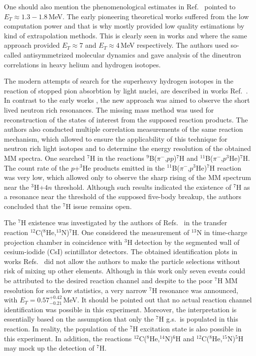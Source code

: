 One should also mention the phenomenological estimates in Ref.\ \cite{Golovkov:2004} pointed to $E_{T} \approx 1.3-1.8$\,MeV.
The early pioneering theoretical works suffered from the low computation power and that is why mostly provided low quality estimations by kind of extrapolation methods.
This is clearly seen in works \cite{Aoyama:2004} and \cite{Aoyama:2009} where the same approach provided $E_{T} \approx 7$ and $E_{T} \approx 4$\,MeV respectively.
The authors used so-called antisymmetrized molecular dynamics and gave analysis of the dineutron correlations in heavy helium and hydrogen isotopes.

The modern attempts of search for the superheavy hydrogen isotopes in the reaction of stopped pion absorbtion by light nuclei, are described in works Ref.\ \cite{Gurov:2007,Gurov:2009}.
In contrast to the early works \cite{Seth:1981,Evseev:1981}, the new approach was aimed to observe the short lived neutron rich resonances.
The missing mass method was used for reconstruction of the states of interest from the supposed reaction products.
The authors also conducted multiple correlation measurements of the same reaction mechanism, which allowed to ensure the applicability of this technique for neutron rich light isotopes and to determine the energy resolution of the obtained MM spectra.
One searched $^7$H in the reactions $^{9}$B($\pi^-$,$p$$p$)$^7$H and $^{11}$B($\pi^-$,$p^3$He)$^7$H.
The count rate of the $p$+$^3$He products emitted in the $^{11}$B($\pi^-$,$p^3$He)$^7$H reaction was very low, which allowed only to observe the sharp rising of the MM spectrum near the $^3$H+$4n$ threshold.
Although such results indicated the existence of $^7$H as a resonance near the threshold of the supposed five-body breakup, the authors concluded that the $^{7}$H issue remains open.

The $^{7}$H existence was investigated by the authors of Refs.\ \cite{Caamano:2007,Caamano:2008} in the transfer reaction $^{12}$C($^{8}$He,$^{13}$N)$^{7}$H.
One considered the measurement of $^{13}$N in time-charge projection chamber in coincidence with $^{3}$H detection by the segmented wall of cesium-iodide (CsI) scintillator detectors.
The obtained identification plots in works Refs.\ \cite{Caamano:2007,Caamano:2008} did not allow the authors to make the particle selections without risk of mixing up other elements.
Although in this work only seven events could be attributed to the desired reaction channel and despite to the poor $^{7}$H MM resolution for such low statistics, a very narrow $^7$H resonance was announced, with $E_T= 0.57^{+0.42}_{-0.21}$\,MeV.
It should be pointed out that no actual reaction channel identification was possible in this experiment.
Moreover, the interpretation is essentially based on the assumption that only the $^{7}$H g.s.\ is populated in this reaction.
In reality, the population of the $^{7}$H excitation state is also possible in this experiment.
In addition, the reactions $^{12}$C($^{8}$He,$^{14}$N)$^{6}$H and $^{12}$C($^{8}$He,$^{15}$N)$^{5}$H may mock up the detection of $^{7}$H.

